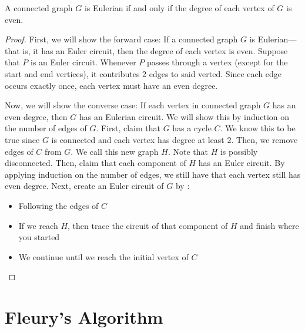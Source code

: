\begin{theorem}[Euler, 1736]
  A connected graph \(G\) is Eulerian if and only if the
degree of each vertex of \(G\) is even.
\end{theorem}

\begin{proof}
  First, we will show the forward case: If a connected graph \(G\) is
  Eulerian---that is, it has an Euler circuit, then the degree of each vertex is
  even. Suppose that \(P\) is an Euler circuit. Whenever \(P\) passes through a
  vertex (except for the start and end vertices), it contributes 2 edges to said
  verted. Since each edge occurs exactly once, each vertex must have an even
  degree.

  Now, we will show the converse case: If each vertex in connected graph \(G\) has an even degree, then \(G\) has an Eulerian circuit. We will show this by induction on the number of edges of \(G\). First, claim that \(G\) has a cycle \(C\). We know this to be true since \(G\) is connected and each vertex has degree at least 2. Then, we remove edges of \(C\) from \(G\). We call this new graph \(H\). Note that \(H\) is possibly disconnected. Then, claim that each component of \(H\) has an Euler circuit. By applying induction on the number of edges, we still have that each vertex still has even degree. Next, create an Euler circuit of \(G\) by :
  \begin{itemize}
    \item Following the edges of \(C\)
    \item If we reach \(H\), then trace the circuit of that component of \(H\) and finish where you started
    \item We continue until we reach the initial vertex of \(C\)
  \end{itemize}
\end{proof}

\section{Fleury's Algorithm}


